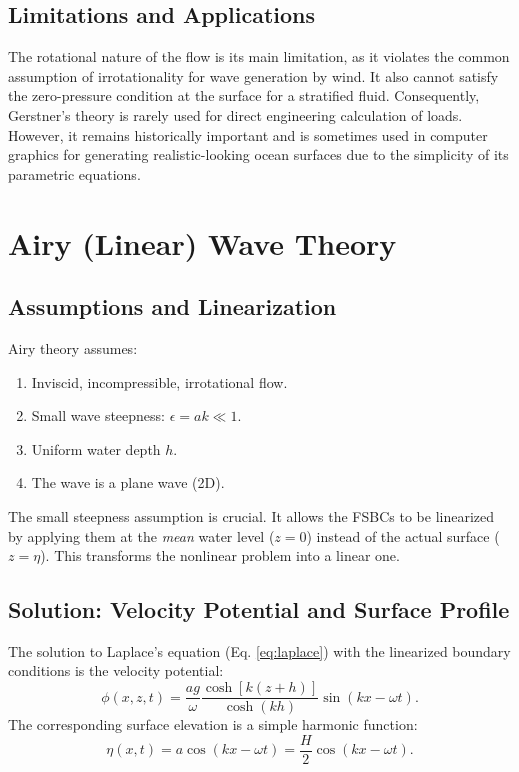 \documentclass[11pt,a4paper]{article}
\begin{document}
\subsection{Limitations and Applications}
The rotational nature of the flow is its main limitation, as it violates the common assumption of irrotationality for wave generation by wind. It also cannot satisfy the zero-pressure condition at the surface for a stratified fluid. Consequently, Gerstner's theory is rarely used for direct engineering calculation of loads. However, it remains historically important and is sometimes used in computer graphics for generating realistic-looking ocean surfaces due to the simplicity of its parametric equations.

\section{Airy (Linear) Wave Theory}
\subsection{Assumptions and Linearization}
Airy theory assumes:
\begin{enumerate}
    \item Inviscid, incompressible, irrotational flow.
    \item Small wave steepness: $\epsilon = ak \ll 1$.
    \item Uniform water depth $h$.
    \item The wave is a plane wave (2D).
\end{enumerate}
The small steepness assumption is crucial. It allows the FSBCs to be linearized by applying them at the \emph{mean} water level ($z=0$) instead of the actual surface ($z=\eta$). This transforms the nonlinear problem into a linear one.

\subsection{Solution: Velocity Potential and Surface Profile}
The solution to Laplace's equation (Eq. \ref{eq:laplace}) with the linearized boundary conditions is the velocity potential:
\begin{equation}
\phi(x,z,t) = \frac{a g}{\omega} \frac{\cosh[k(z+h)]}{\cosh(kh)} \sin(kx - \omega t).
\label{eq:airypotential}
\end{equation}
The corresponding surface elevation is a simple harmonic function:
\begin{equation}
\eta(x,t) = a \cos(kx - \omega t) = \frac{H}{2} \cos(kx - \omega t).
\label{eq:airyeta}
\end{equation}
\end{document}
